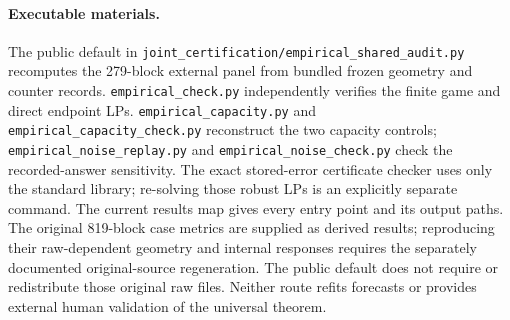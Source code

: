 \paragraph{Executable materials.}
The public default in \texttt{joint\_certification/empirical\_shared\_audit.py}
recomputes the 279-block external panel from bundled frozen geometry and
counter records. \texttt{empirical\_check.py} independently verifies the
finite game and direct endpoint LPs. \texttt{empirical\_capacity.py} and
\texttt{empirical\_capacity\_check.py} reconstruct the two capacity controls;
\texttt{empirical\_noise\_replay.py} and
\texttt{empirical\_noise\_check.py} check the recorded-answer sensitivity.
The exact stored-error certificate checker uses only the standard library;
re-solving those robust LPs is an explicitly separate command. The current
results map gives every entry point and its output paths. The original
819-block case metrics are supplied as derived results; reproducing their
raw-dependent geometry and internal responses requires the separately
documented original-source regeneration. The public default does not require
or redistribute those original raw files. Neither route refits forecasts or
provides external human validation of the universal theorem.

